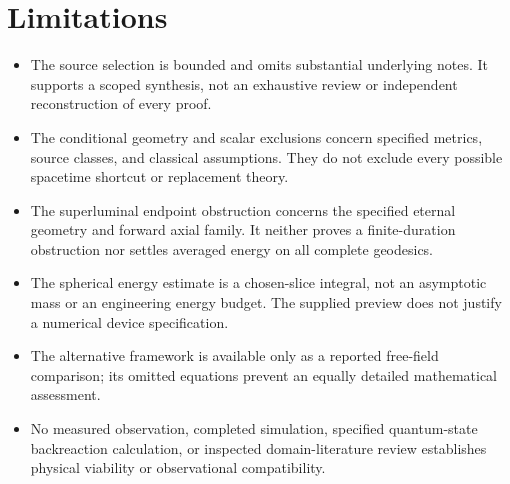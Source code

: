 \documentclass[11pt]{article}
\begin{document}
\section{Limitations}
\begin{itemize}
\item The source selection is bounded and omits substantial underlying notes. It supports a scoped synthesis, not an exhaustive review or independent reconstruction of every proof.
\item The conditional geometry and scalar exclusions concern specified metrics, source classes, and classical assumptions. They do not exclude every possible spacetime shortcut or replacement theory.
\item The superluminal endpoint obstruction concerns the specified eternal geometry and forward axial family. It neither proves a finite-duration obstruction nor settles averaged energy on all complete geodesics.
\item The spherical energy estimate is a chosen-slice integral, not an asymptotic mass or an engineering energy budget. The supplied preview does not justify a numerical device specification.
\item The alternative framework is available only as a reported free-field comparison; its omitted equations prevent an equally detailed mathematical assessment.
\item No measured observation, completed simulation, specified quantum-state backreaction calculation, or inspected domain-literature review establishes physical viability or observational compatibility.
\end{itemize}
\end{document}
